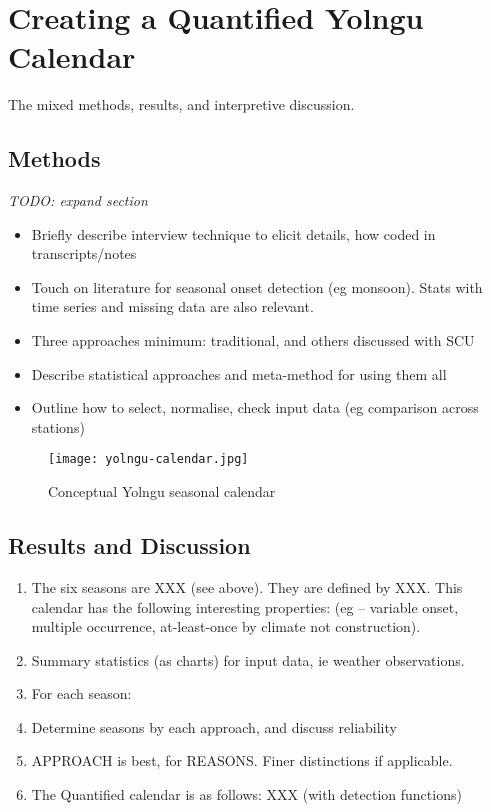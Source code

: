 \chapter{Creating a Quantified Yolngu Calendar}
\label{ch:quantify}
The mixed methods, results, and interpretive discussion.

\section{Methods}

\emph{TODO:  expand section}
\begin{itemize}
\item Briefly describe interview technique to elicit details, how coded in transcripts/notes
\item Touch on literature for seasonal onset detection (eg monsoon).
        Stats with time series and missing data are also relevant.
\item Three approaches minimum:  traditional, and others discussed with SCU
\item Describe statistical approaches and meta-method for using them all
\item Outline how to select, normalise, check input data (eg comparison across stations)
\end{itemize}

\begin{figure}[h]
    \centering
    \texttt{[image: yolngu-calendar.jpg]}
    \caption{Conceptual Yolngu seasonal calendar \citep{davis1989}}
    \label{fig:yolngu-seasons}
\end{figure}

\section{Results and Discussion}

\begin{enumerate}
\item The six seasons are XXX (see above).  They are defined by XXX.
        This calendar has the following interesting properties:
        (eg – variable onset, multiple occurrence, at-least-once by climate not construction).
\item Summary statistics (as charts) for input data, ie weather observations.
\item For each season:
\item Determine seasons by each approach, and discuss reliability
\item APPROACH is best, for REASONS.  Finer distinctions if applicable.
\item The Quantified calendar is as follows:  XXX (with detection functions)
\end{enumerate}

